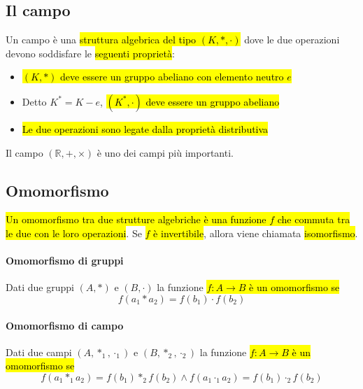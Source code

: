 \subsection{Il campo}
Un campo è una \hl{struttura algebrica del tipo $(K, \ast, \cdot)$} dove le due
operazioni devono soddisfare le \hl{seguenti proprietà}:
\begin{itemize}
    \item \hl{$(K, \ast)$ deve essere un gruppo abeliano con elemento neutro $e$}
    \item Detto $K^* = K - {e}$, \hl{$(K^*, \cdot)$ deve essere un gruppo abeliano}
    \item \hl{Le due operazioni sono legate dalla proprietà distributiva}
\end{itemize}

Il campo $(\mathbb{R}, +, \times)$ è uno dei campi più importanti.

\subsection{Omomorfismo}
\hl{Un omomorfismo tra due strutture algebriche è una funzione $f$ che commuta
tra le due con le loro operazioni}. Se \hl{$f$ è invertibile}, allora viene
chiamata \hl{isomorfismo}.

\paragraph{Omomorfismo di gruppi} Dati due gruppi $(A, \ast)$ e $(B, \cdot)$ la
funzione \hl{$f: A \to B$ è un omomorfismo se}
\[
    f(a_1 \ast a_2) = f(b_1) \cdot f(b_2)
\]

\paragraph{Omomorfismo di campo} Dati due campi $(A, \ast_1, \cdot_1)$ e
$(B, \ast_2, \cdot_2)$ la funzione \hl{$f: A \to B$ è un omomorfismo se}
\[
    f(a_1 \ast_1 a_2) = f(b_1) \ast_2 f(b_2) \wedge
        f(a_1 \cdot_1 a_2) = f(b_1) \cdot_2 f(b_2)
\]


